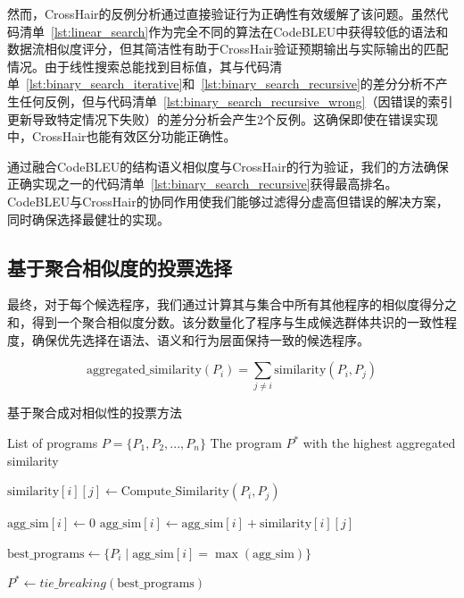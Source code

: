 \documentclass{article}
\begin{document}
\begin{CJK*}{UTF8}{gbsn}
然而，CrossHair的反例分析通过直接验证行为正确性有效缓解了该问题。虽然代码清单~\ref{lst:linear_search}作为完全不同的算法在CodeBLEU中获得较低的语法和数据流相似度评分，但其简洁性有助于CrossHair验证预期输出与实际输出的匹配情况。由于线性搜索总能找到目标值，其与代码清单~\ref{lst:binary_search_iterative}和~\ref{lst:binary_search_recursive}的差分分析不产生任何反例，但与代码清单~\ref{lst:binary_search_recursive_wrong}（因错误的索引更新导致特定情况下失败）的差分分析会产生2个反例。这确保即使在错误实现中，CrossHair也能有效区分功能正确性。

通过融合CodeBLEU的结构语义相似度与CrossHair的行为验证，我们的方法确保正确实现之一的代码清单~\ref{lst:binary_search_recursive}获得最高排名。CodeBLEU与CrossHair的协同作用使我们能够过滤得分虚高但错误的解决方案，同时确保选择最健壮的实现。
\subsection{基于聚合相似度的投票选择}

最终，对于每个候选程序，我们通过计算其与集合中所有其他程序的相似度得分之和，得到一个聚合相似度分数。该分数量化了程序与生成候选群体共识的一致性程度，确保优先选择在语法、语义和行为层面保持一致的候选程序。

\begin{equation}
\text{aggregated\_similarity}(P_i) = \sum_{j \neq i} \text{similarity}(P_i, P_j)
\end{equation}

\begin{algorithm}[t!]
\caption{基于聚合成对相似性的投票方法}
\label{alg:ensemble_selection}
\begin{algorithmic}[1]

\Require List of programs \( P = \{P_1, P_2, ..., P_n\} \)
\Ensure The program \( P^* \) with the highest aggregated similarity

        \State \( \text{similarity}[i][j] \gets \text{Compute\_Similarity}(P_i, P_j) \)
    \EndFor
\EndFor

    \State \( \text{agg\_sim}[i] \gets 0 \)
        \State \( \text{agg\_sim}[i] \gets \text{agg\_sim}[i] + \text{similarity}[i][j] \)
    \EndFor
\EndFor

\State \( \text{best\_programs} \gets \{ P_i \mid \text{agg\_sim}[i] = \max(\text{agg\_sim}) \} \)

\State \( P^* \gets tie\_breaking(\text{best\_programs}) \)


\end{algorithmic}
\end{algorithm}
\end{CJK*}
\end{document}
